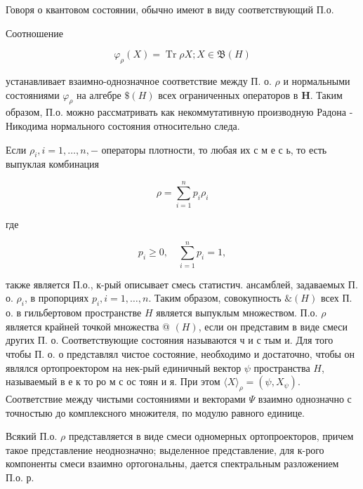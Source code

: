 \documentclass[10pt]{article}
\begin{document}
Говоря о квантовом состоянии, обычно имеют в виду соответствующий П.о.



Соотношение



\[

\varphi_{\rho}(X)=\operatorname{Tr} \rho X ; X \in \mathfrak{B}(H)

\]



устанавливает взаимно-однозначное соответствие между П. о. $\rho$ и нормальными состояниями $\varphi_{\rho}$ на алгебре $\$(H)$ всех ограниченных операторов в $\boldsymbol{H}$. Таким образом, П.о. можно рассматривать как некоммутативную производную Радона - Никодима нормального состояния относительно следа.



Если $\rho_{i}, i=1, \ldots, n,-$ операторы плотности, то любая их с м е с ь, то есть выпуклая комбинация



\[

\rho=\sum_{i=1}^{n} p_{i} \rho_{i}

\]



где



\[

p_{i} \geqslant 0, \quad \sum_{i=1}^{n} p_{i}=1,

\]



также является П.о., к-рый описывает смесь статистич. ансамблей, задаваемых П. о. $\rho_{i}$, в пропорциях $p_{i}, i=1, \ldots, n$. Таким образом, совокупность $\&(H)$ всех П. о. в гильбертовом пространстве $H$ является выпуклым множеством. П.о. $\rho$ является крайней точкой множества @ $(H)$, если он представим в виде смеси других П. о. Соответствующие состояния называются ч и с тым и. Для того чтобы П. о. $о$ представлял чистое состояние, необходимо и достаточно, чтобы он являлся ортопроектором на нек-рый единичный вектор $\psi$ пространства $H$, называемый в е к то ро м с ос тоян и я. При этом $\langle X\rangle_{\rho}=\left(\psi, X_{\psi}\right)$. Соответствие между чистыми состояниями и векторами $\Psi$ взаимно однозначно с точностыю до комплексного множителя, по модулю равного единице.



Всякий П.о. $\rho$ представляется в виде смеси одномерных ортопроекторов, причем такое представление неоднозначно; выделенное представление, для к-рого компоненты смеси взаимно ортогональны, дается спектральным разложением П.о. р.
\end{document}

